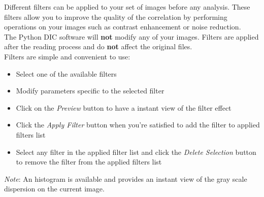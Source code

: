 \newline
\indent\indent Different filters can be applied to your set of images before any analysis. These filters allow you to improve the quality of the correlation by performing operations on your images such as contrast enhancement or noise reduction.\\
\newline
\indent The Python DIC software will \textbf{not} modify any of your images. Filters are applied after the reading process and do \textbf{not} affect the original files.\\
\newline
Filters are simple and convenient to use:
\begin{itemize}
  \item Select one of the available filters
  \item Modify parameters specific to the selected filter
  \item Click on the \textit{Preview} button to have a instant view of the filter effect
  \item Click the \textit{Apply Filter} button when you're satisfied to add the filter to applied filters list
  \item Select any filter in the applied filter list and click the \textit{Delete Selection} button to remove the filter from the applied filters list
\end{itemize}
\newline
\indent \textit{Note}: An histogram is available and provides an instant view of the gray scale dispersion on the current image.
